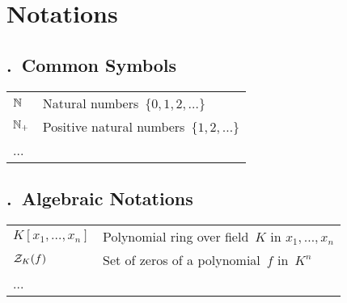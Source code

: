 \section*{Notations}


\setcounter{notationSec}{1}

\subsection*{.~Common Symbols}
\begin{tabular}{m{2.7cm}l}
  $\operatorname{\mathbb{N}}$ & Natural numbers~$\{0,1,2,\dots\}$ \\
  $\operatorname{\mathbb{N}}_+$ & Positive natural numbers~$\{1,2,\dots\}$ \\
  ...
\end{tabular}


\subsection*{.~Algebraic Notations}
\begin{tabular}{m{2.7cm}l}
  $K[x_1,\dots,x_n]$ & Polynomial ring over field~$K$ in $x_1,\dots,x_n$ \\
  $\mathcal{Z}_{K}(f)$ & Set of zeros of a polynomial~$f$ in~$K^n$ \\
  ...
\end{tabular}